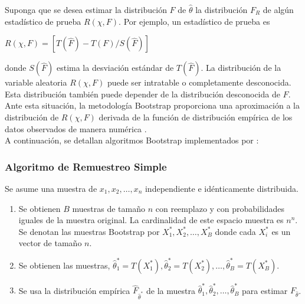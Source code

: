 Suponga que se desea estimar la distribución $F$ de $\hat{\theta}$ la distribución $F_{R}$ de algún estadístico de prueba $R( \chi, F)$. Por ejemplo, un estadístico de prueba es\\

\begin{center}
	$ R( \chi, F) = [T(\hat{F}) - T(F)/S(\hat{F})]$\\
\end{center}

donde $S(\hat{F})$ estima la desviación estándar de $T(\hat{F})$. La distribución de la variable aleatoria $R( \chi, F)$ puede ser intratable o completamente desconocida. Esta distribución también puede depender de la distribución desconocida de $F$. Ante esta situación, la metodología Bootstrap proporciona una aproximación a la distribución de $R( \chi, F)$ derivada de la función de distribución empírica de los datos observados de manera numérica \parencite{balam-2012}.\\

A continuación, se detallan algoritmos Bootstrap implementados por \textcite{balam-2012}:\\

\subsubsection{Algoritmo de Remuestreo Simple \parencite{balam-2012}}

Se asume una muestra de $ x_{1}, x_{2},  \dots,  x_{n}$ independiente e idénticamente distribuida.

\begin{enumerate}
	\item Se obtienen $B$ muestras de tamaño $n$ con reemplazo y con probabilidades iguales de la muestra original. La cardinalidad de este espacio muestra es $n^{n}$. Se denotan las muestras Bootstrap por $X^{*}_{1}, X^{*}_{2},  \dots, X^{*}_{B}$ donde cada $X^{*}_{i}$ es un vector de tamaño $n$.
	
	\item Se obtienen las muestras, $\hat{\theta}^{*}_{1} = T (X^{*}_{1}) , \hat{\theta}^{*}_{2} = T (X^{*}_{2}), \dots,\hat{\theta}^{*}_{B} = T (X^{*}_{B})$.
	
	\item Se usa la distribución empírica $\hat{F}_{\hat{\theta}^{*}}$ de la muestra $\hat{\theta}^{*}_{1},\hat{\theta}^{*}_{2},  \dots, \hat{\theta}^{*}_{B}$ para estimar $F_{\hat{\theta}} $.
\end{enumerate}


